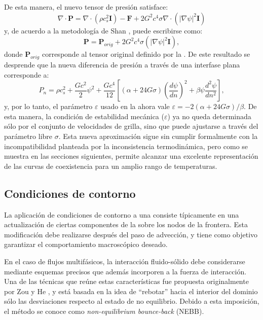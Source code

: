 De esta manera, el nuevo tensor de presi\'on satisface:
\begin{equation}
	\nabla \cdot \bm{P} = \nabla \cdot (\rho c_s^2 \bm{I}) - \bm{F} + 2G^2 c^4 \sigma \nabla \cdot (|\nabla \psi|^2 \bm{I})
\end{equation}
y, de acuerdo a la metodolog\'ia de Shan \cite{shan_pressure_2008}, puede escribirse como:
\begin{equation}
	\bm{P} = \bm{P}_{orig} + 2G^2 c^4 \sigma (|\nabla \psi|^2 \bm{I}),
\end{equation}
donde $\bm{P}_{orig}$ corresponde al tensor original definido por la . De este resultado se desprende que la nueva diferencia de presi\'on a trav\'es de una interfase plana corresponde a:
\begin{equation}
	P_n = \rho c_s^2 + \dfrac{G c^2}{2} \psi^2 + \dfrac{G c^4}{12} \left[ (\alpha+24G\sigma) \left( \dfrac{d\psi}{dn} \right)^2 + \beta \psi \dfrac{d^2 \psi}{dn^2} \right],
\end{equation}
y, por lo tanto, el par\'ametro $\varepsilon$ usado en la  ahora vale $\varepsilon=-2(\alpha + 24 G \sigma)/\beta$. De esta manera, la condici\'on de estabilidad mec\'anica ($\varepsilon$) ya no queda determinada s\'olo por el conjunto de velocidades de grilla, sino que puede ajustarse a trav\'es del par\'ametro libre $\sigma$. Esta nueva aproximaci\'on sigue sin cumplir formalmente con la incompatibilidad planteada por la inconsistencia termodin\'amica, pero como se muestra en las secciones siguientes, permite alcanzar una excelente representaci\'on de las curvas de coexistencia para un amplio rango de temperaturas.




\subsection{Condiciones de contorno}

La aplicaci\'on de condiciones de contorno a una \lbe{} consiste t\'ipicamente en una actualizaci\'on de ciertas componentes de la \fdp{} sobre los nodos de la frontera. Esta modificaci\'on debe realizarse despu\'es del paso de advecci\'on, y tiene como objetivo garantizar el comportamiento macrosc\'opico deseado.

En el caso de flujos multif\'asicos, la interacci\'on fluido-s\'olido debe considerarse mediante esquemas precisos que  adem\'as incorporen a la fuerza de interacci\'on. Una de las t\'ecnicas que re\'une estas caracter\'isticas fue propuesta originalmente por Zou y He \cite{zou_pressure_1997}, y est\'a basada en la idea de ``rebotar'' hacia el interior del dominio s\'olo las desviaciones respecto al estado de no equilibrio. Debido a esta imposici\'on, el m\'etodo se conoce como \emph{non-equilibrium bounce-back} (NEBB).

